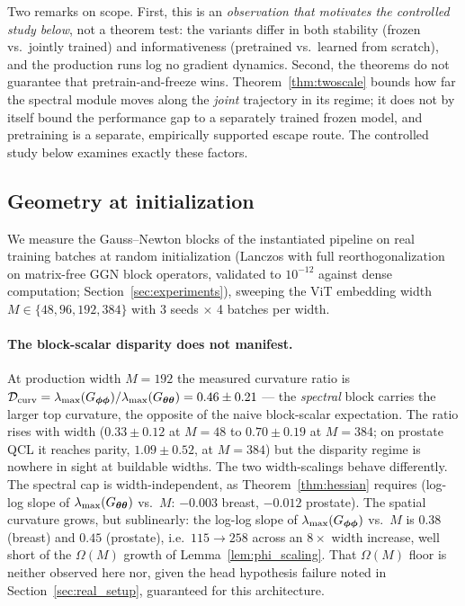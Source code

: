 Two remarks on scope. First, this is an \emph{observation that
motivates the controlled study below}, not a theorem test: the
variants differ in both stability (frozen vs.\ jointly trained) and
informativeness (pretrained vs.\ learned from scratch), and the
production runs log no gradient dynamics. Second, the theorems do not
guarantee that pretrain-and-freeze wins. Theorem~\ref{thm:twoscale}
bounds how far the spectral module moves along the \emph{joint}
trajectory in its regime; it does not by itself bound the performance
gap to a separately trained frozen model, and pretraining is a
separate, empirically supported escape route. The controlled study
below examines exactly these factors.

\subsection{Geometry at initialization}
\label{sec:real_geometry}

We measure the Gauss--Newton blocks of the instantiated pipeline on
real training batches at random initialization (Lanczos with full
reorthogonalization on matrix-free GGN block operators, validated to
$10^{-12}$ against dense computation; Section~\ref{sec:experiments}),
sweeping the ViT embedding width $M \in \{48, 96, 192, 384\}$ with
3 seeds $\times$ 4 batches per width.

\paragraph{The block-scalar disparity does not manifest.}
At production width $M=192$ the measured curvature ratio is
$\mathcal{D}_{\mathrm{curv}} = \lambda_{\max}(G_{{\boldsymbol{\phi}}{\boldsymbol{\phi}}})/\lambda_{\max}(G_{{\boldsymbol{\theta}}{\boldsymbol{\theta}}})
= 0.46 \pm 0.21$ --- the \emph{spectral} block carries the larger top
curvature, the opposite of the naive block-scalar expectation. The
ratio rises with width ($0.33 \pm 0.12$ at $M{=}48$ to
$0.70 \pm 0.19$ at $M{=}384$; on prostate QCL it reaches parity,
$1.09 \pm 0.52$, at $M{=}384$) but the disparity regime is nowhere in
sight at buildable widths. The two width-scalings behave differently.
The spectral cap is width-independent, as Theorem~\ref{thm:hessian}
requires (log-log slope of $\lambda_{\max}(G_{{\boldsymbol{\theta}}{\boldsymbol{\theta}}})$ vs.\ $M$:
$-0.003$ breast, $-0.012$ prostate). The spatial curvature grows, but
sublinearly: the log-log slope of $\lambda_{\max}(G_{{\boldsymbol{\phi}}{\boldsymbol{\phi}}})$ vs.\
$M$ is $0.38$ (breast) and $0.45$ (prostate), i.e.\ $115 \to 258$
across an $8\times$ width increase, well short of the $\Omega(M)$
growth of Lemma~\ref{lem:phi_scaling}. That $\Omega(M)$ floor is
neither observed here nor, given the head hypothesis failure noted in
Section~\ref{sec:real_setup}, guaranteed for this architecture.

